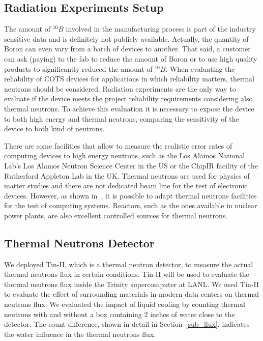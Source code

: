 \subsection{Radiation Experiments Setup}
\label{sub_beam_setup}

The amount of $^{10}B$ involved in the manufacturing process is part of the industry sensitive data and is definitely not publicly available. Actually, the quantity of Boron can even vary from a batch of devices to another. That said, a customer can ask (paying) to the fab to reduce the amount of Boron or to use high quality products to significantly reduced the amount of $^{10}B$. When evaluating the reliability of COTS devices for applications in which reliability matters, thermal neutrons should be considered. Radiation experiments are the only way to evaluate if the device meets the project reliability requirements considering also thermal neutrons. To achieve this evaluation it is necessary to expose the device to both high energy and thermal neutrons, comparing the sensitivity of the device to both kind of neutrons.

There are some facilities that allow to measure the realistic error rates of computing devices to high energy neutrons, such as the Los Alamos National Lab's Los Alamos Neutron Science Center in the US or the ChipIR facility of the Rutherford Appleton Lab in the UK. Thermal neutrons are used for physics of matter studies and there are not dedicated beam line for the test of electronic devices. However, as shown in~\cite{jsc2020}, it is possible to adapt thermal neutrons facilities for the test of computing systems. Reactors, such as the ones available in nuclear power plants, are also excellent controlled sources for thermal neutrons.

\subsection{Thermal Neutrons Detector}
\label{sub_detector}

We deployed Tin-II, which is a thermal neutron detector,  to measure the actual thermal neutrons flux in certain conditions. Tin-II will be used to evaluate the thermal neutrons flux inside the Trinity supercomputer at LANL.  We used Tin-II to evaluate the effect of surrounding materials in modern data centers on thermal neutrons flux. We evaluated the impact of liquid cooling by counting thermal neutrons with and without a box containing 2 inches of water close to the detector. The count difference, shown in detail in Section~\ref{sub_flux}, indicates the water influence in the thermal neutrons flux.

